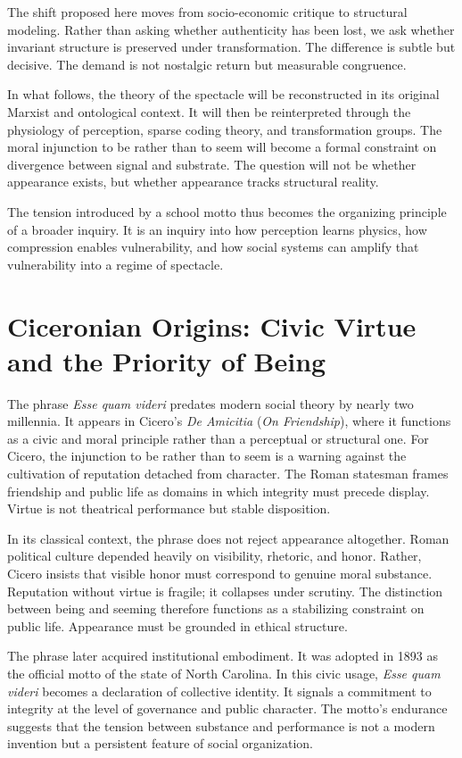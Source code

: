 \documentclass[11pt]{article}
\begin{document}
The shift proposed here moves from socio-economic critique to structural modeling. Rather than asking whether authenticity has been lost, we ask whether invariant structure is preserved under transformation. The difference is subtle but decisive. The demand is not nostalgic return but measurable congruence.

In what follows, the theory of the spectacle will be reconstructed in its original Marxist and ontological context. It will then be reinterpreted through the physiology of perception, sparse coding theory, and transformation groups. The moral injunction to be rather than to seem will become a formal constraint on divergence between signal and substrate. The question will not be whether appearance exists, but whether appearance tracks structural reality.

The tension introduced by a school motto thus becomes the organizing principle of a broader inquiry. It is an inquiry into how perception learns physics, how compression enables vulnerability, and how social systems can amplify that vulnerability into a regime of spectacle.

\section{Ciceronian Origins: Civic Virtue and the Priority of Being}

The phrase \textit{Esse quam videri} predates modern social theory by nearly two millennia. It appears in Cicero’s \textit{De Amicitia} (\textit{On Friendship}), where it functions as a civic and moral principle rather than a perceptual or structural one. For Cicero, the injunction to be rather than to seem is a warning against the cultivation of reputation detached from character. The Roman statesman frames friendship and public life as domains in which integrity must precede display. Virtue is not theatrical performance but stable disposition.

In its classical context, the phrase does not reject appearance altogether. Roman political culture depended heavily on visibility, rhetoric, and honor. Rather, Cicero insists that visible honor must correspond to genuine moral substance. Reputation without virtue is fragile; it collapses under scrutiny. The distinction between being and seeming therefore functions as a stabilizing constraint on public life. Appearance must be grounded in ethical structure.

The phrase later acquired institutional embodiment. It was adopted in 1893 as the official motto of the state of North Carolina. In this civic usage, \textit{Esse quam videri} becomes a declaration of collective identity. It signals a commitment to integrity at the level of governance and public character. The motto’s endurance suggests that the tension between substance and performance is not a modern invention but a persistent feature of social organization.
\end{document}
